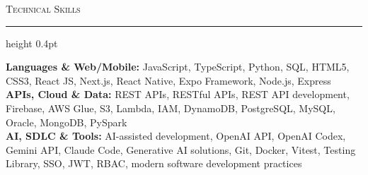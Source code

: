 \documentclass[letterpaper,11pt]{article}
\newcommand{\resumesection}[1]{%
  \par\vspace{2pt}%
  {\large\scshape #1}\par\vspace{2pt}%
  \hrule height 0.4pt\vspace{2pt}%
}
\begin{document}
\resumesection{Technical Skills}
\textbf{Languages \& Web/Mobile:} JavaScript, TypeScript, Python, SQL, HTML5, CSS3, React JS, Next.js, React Native, Expo Framework, Node.js, Express\\
\textbf{APIs, Cloud \& Data:} REST APIs, RESTful APIs, REST API development, Firebase, AWS Glue, S3, Lambda, IAM, DynamoDB, PostgreSQL, MySQL, Oracle, MongoDB, PySpark\\
\textbf{AI, SDLC \& Tools:} AI-assisted development, OpenAI API, OpenAI Codex, Gemini API, Claude Code, Generative AI solutions, Git, Docker, Vitest, Testing Library, SSO, JWT, RBAC, modern software development practices
\end{document}
